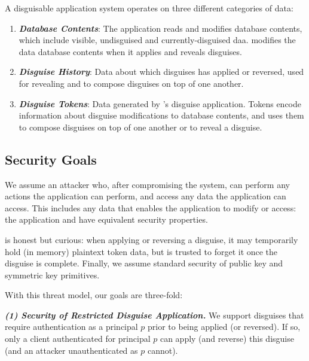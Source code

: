 \noindent
A disguisable application system operates on three different categories of data:
\begin{enumerate}
    \item \emph{\textbf{Database Contents}}: The application reads and modifies database
        contents, which include visible, undisguised and currently-disguised daa.
        \sys modifies the data database contents when it applies and reveals disguises.
    \item \emph{\textbf{Disguise History}}: Data about which disguises \sys has applied or
        reversed, used for revealing and to compose disguises on top of one another. 
    \item \emph{\textbf{Disguise Tokens}}: Data generated by \sys's
        disguise application. Tokens encode information about disguise modifications to database
        contents, and \sys uses them to compose disguises on top of one another or to reveal a
        disguise. 
\end{enumerate}

\subsection{Security Goals}
We assume an attacker who, after compromising the system, can perform any actions the
application can perform, and access any data the application can access. This includes any data that
\sys enables the application to modify or access: the application and \sys have equivalent security
properties.

\sys is honest but curious: when applying or reversing a disguise, it may temporarily
hold (in memory) plaintext token data, but is trusted to forget it once the disguise is complete.
Finally, we assume standard security of public key and symmetric key primitives.

With this threat model, our goals are three-fold: 

\vspace{6pt}\noindent\textbf{\emph{(1) Security of Restricted Disguise Application.}}
We support disguises that require authentication as a principal $p$ prior to being applied (or
reversed). If so, only a client authenticated for principal $p$ can apply (and reverse) this
disguise (and an attacker unauthenticated as $p$ cannot).

